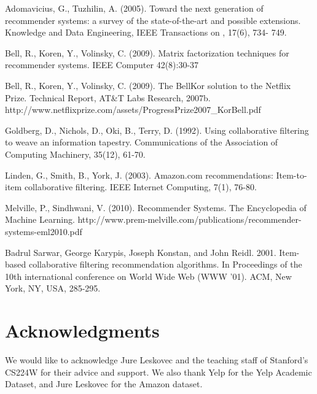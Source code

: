 \documentclass[letterpaper, 11 pt, conference]{ieeeconf}
\begin{document}
\begin{thebibliography}{99}

Adomavicius, G., Tuzhilin, A. (2005). Toward the next generation of recommender systems: a survey of the state-of-the-art and possible extensions. Knowledge and Data Engineering, IEEE Transactions on , 17(6),  734- 749.

Bell, R., Koren, Y., Volinsky, C. (2009). Matrix factorization techniques for recommender systems. IEEE Computer 42(8):30-37

Bell, R., Koren, Y., Volinsky, C. (2009). 
The BellKor solution to the Netﬂix Prize. Technical Report, AT\&T Labs 
Research, 2007b. 
http://www.netflixprize.com/assets/ProgressPrize2007\_KorBell.pdf


Goldberg, D., Nichols, D., Oki, B., Terry, D. (1992). 
Using collaborative filtering to weave an information tapestry. 
Communications of the Association of Computing Machinery, 35(12), 61-70.

Linden, G., Smith, B., York, J. (2003). Amazon.com recommendations: Item-to-item collaborative filtering. IEEE Internet
Computing, 7(1), 76-80.

Melville, P., Sindhwani, V. (2010).
Recommender Systems. The Encyclopedia of Machine Learning. 
http://www.prem-melville.com/publications/recommender-systems-eml2010.pdf

Badrul Sarwar, George Karypis, Joseph Konstan, and John Reidl. 2001.
Item-based collaborative filtering recommendation algorithms.
In Proceedings of the 10th international conference on World Wide Web (WWW '01). ACM, New York, NY, USA, 285-295. 

\end{thebibliography}

\section{Acknowledgments}
We would like to acknowledge Jure Leskovec and the teaching staff of 
Stanford's CS224W for their advice and support. We also thank Yelp for the 
Yelp Academic Dataset, and Jure Leskovec for the Amazon dataset.
\end{document}
